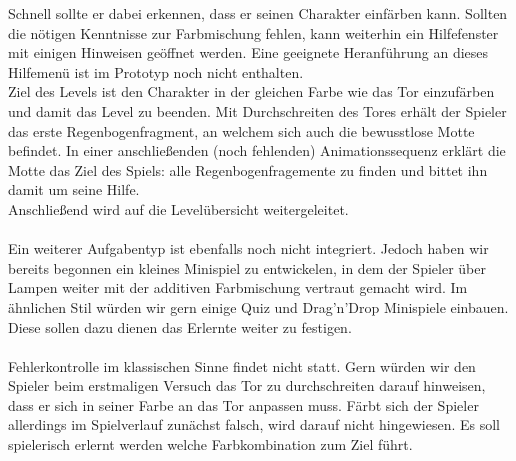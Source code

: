 \documentclass[10pt,a4paper,notitlepage]{report}
\begin{document}
	Schnell sollte er dabei erkennen, dass er seinen Charakter einfärben kann. Sollten die nötigen Kenntnisse zur Farbmischung fehlen,
	kann weiterhin ein Hilfefenster mit einigen Hinweisen geöffnet werden. Eine geeignete Heranführung an dieses Hilfemenü
	ist im Prototyp noch nicht enthalten.\\
	Ziel des Levels ist den Charakter in der gleichen Farbe wie das Tor einzufärben und damit das Level zu beenden.
	Mit Durchschreiten des Tores erhält der Spieler das erste Regenbogenfragment, an welchem sich auch die bewusstlose Motte befindet.
	In einer anschließenden (noch fehlenden)  Animationssequenz erklärt die Motte das Ziel des Spiels: alle Regenbogenfragemente zu finden und bittet ihn damit um
 	seine Hilfe.\\
	Anschließend wird auf die Levelübersicht weitergeleitet.\\
	\\
	Ein weiterer Aufgabentyp ist ebenfalls noch nicht integriert. Jedoch haben wir bereits begonnen ein kleines Minispiel zu entwickelen, in dem der Spieler 
	über Lampen weiter mit der additiven Farbmischung vertraut gemacht wird. Im ähnlichen Stil würden wir gern einige Quiz und Drag'n'Drop Minispiele
	einbauen.\\
	Diese sollen dazu dienen das Erlernte weiter zu festigen.\\
	\\
	Fehlerkontrolle im klassischen Sinne findet nicht statt. Gern würden wir den Spieler beim erstmaligen Versuch das Tor zu durchschreiten darauf hinweisen,
	dass er sich in seiner Farbe an das Tor anpassen muss. Färbt sich der Spieler allerdings im Spielverlauf zunächst falsch, wird darauf nicht hingewiesen.
	Es soll spielerisch erlernt werden welche Farbkombination zum Ziel führt.\\
	\\\\
	\Fusszeile
\end{document}
